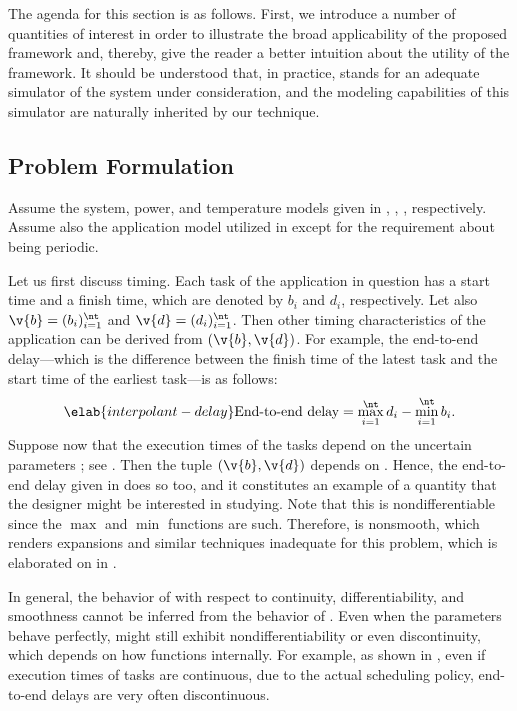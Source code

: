 The agenda for this section is as follows. First, we introduce a number of
quantities of interest \g in order to illustrate the broad applicability of the
proposed framework and, thereby, give the reader a better intuition about the
utility of the framework. It should be understood that, in practice, \g stands
for an adequate simulator of the system under consideration, and the modeling
capabilities of this simulator are naturally inherited by our technique.

\subsection{Problem Formulation}

Assume the system, power, and temperature models given in ,
, , respectively. Assume also the
application model utilized in  except for the
requirement about being periodic.

Let us first discuss timing. Each task of the application in question has a
start time and a finish time, which are denoted by $b_i$ and $d_i$,
respectively. Let also $\v{b} = (b_i)_{i = 1}^\nt$ and $\v{d} = (d_i)_{i =
1}^\nt$. Then other timing characteristics of the application can be derived
from $(\v{b}, \v{d})$. For example, the end-to-end delay---which is the
difference between the finish time of the latest task and the start time of the
earliest task---is as follows:
\begin{equation} \elab{interpolant-delay}
  \text{End-to-end delay}
  = \max_{i = 1}^\nt d_i - \min_{i = 1}^\nt b_i.
\end{equation}
Suppose now that the execution times of the tasks depend on the uncertain
parameters \vu; see . Then the tuple $(\v{b}, \v{d})$
depends on \vu. Hence, the end-to-end delay given in 
does so too, and it constitutes an example of a quantity \g that the designer
might be interested in studying. Note that this \g is nondifferentiable since
the $\max$ and $\min$ functions are such. Therefore, \g is nonsmooth, which
renders  expansions and similar techniques inadequate for this problem,
which is elaborated on in .

\begin{remark} 
In general, the behavior of \g with respect to continuity, differentiability,
and smoothness cannot be inferred from the behavior of \vu. Even when the
parameters behave perfectly, \g might still exhibit nondifferentiability or even
discontinuity, which depends on how \g functions internally. For example, as
shown in \cite{tanasa2015}, even if execution times of tasks are continuous, due
to the actual scheduling policy, end-to-end delays are very often discontinuous.
\end{remark}

